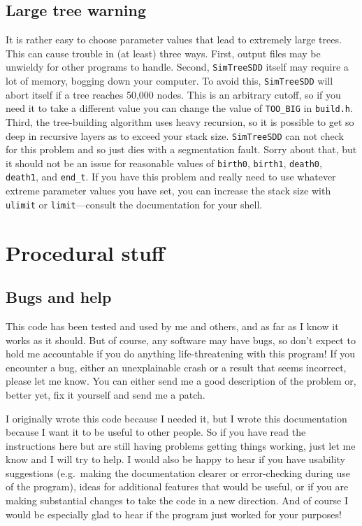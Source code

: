 \documentclass[10pt]{article}
\begin{document}
\subsection*{Large tree warning}

It is rather easy to choose parameter values that lead to extremely large trees.  This can cause trouble in (at least) three ways.
First, output files may be unwieldy for other programs to handle.
Second, \texttt{SimTreeSDD} itself may require a lot of memory, bogging down your computer.  To avoid this, \texttt{SimTreeSDD} will abort itself if a tree reaches 50,000 nodes.  This is an arbitrary cutoff, so if you need it to take a different value you can change the value of \texttt{TOO\_BIG} in \texttt{build.h}.
Third, the tree-building algorithm uses heavy recursion, so it is possible to get so deep in recursive layers as to exceed your stack size.  \texttt{SimTreeSDD} can not check for this problem and so just dies with a segmentation fault.  Sorry about that, but it should not be an issue for reasonable values of \texttt{birth0}, \texttt{birth1}, \texttt{death0}, \texttt{death1}, and \texttt{end\_t}.  If you have this problem and really need to use whatever extreme parameter values you have set, you can increase the stack size with \texttt{ulimit} or \texttt{limit}---consult the documentation for your shell.


\section*{Procedural stuff}

\subsection*{Bugs and help}
This code has been tested and used by me and others, and as far as I know it works as it should.  But of course, any software may have bugs, so don't expect to hold me accountable if you do anything life-threatening with this program!
If you encounter a bug, either an unexplainable crash or a result that seems incorrect, please let me know.  You can either send me a good description of the problem or, better yet, fix it yourself and send me a patch.

I originally wrote this code because I needed it, but I wrote this documentation because I want it to be useful to other people.  So if you have read the instructions here but are still having problems getting things working, just let me know and I will try to help.
I would also be happy to hear if you have usability suggestions (e.g.\ making the documentation clearer or error-checking during use of the program), ideas for additional features that would be useful, or if you are making substantial changes to take the code in a new direction.  And of course I would be especially glad to hear if the program just worked for your purposes!
\end{document}
